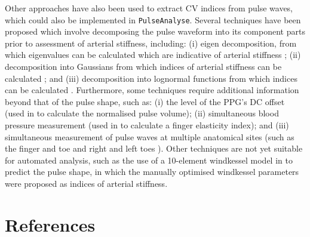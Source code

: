 \documentclass[12pt]{iopart}
\newcommand{\pa}{\texttt{PulseAnalyse}}
\begin{document}
Other approaches have also been used to extract CV indices from pulse waves, which could also be implemented in \pa{}. Several techniques have been proposed which involve decomposing the pulse waveform into its component parts prior to assessment of arterial stiffness, including: (i) eigen decomposition, from which eigenvalues can be calculated which are indicative of arterial stiffness \cite{Angarita-jaimes2006}; (ii) decomposition into Gaussians from which indices of arterial stiffness can be calculated \cite{Rubins2008}; and (iii) decomposition into lognormal functions from which indices can be calculated \cite{Huotari2011}. Furthermore, some techniques require additional information beyond that of the pulse shape, such as: (i) the level of the PPG's DC offset (used in \cite{Sawada2001} to calculate the normalised pulse volume); (ii) simultaneous blood pressure measurement (used in \cite{Tanaka2011} to calculate a finger elasticity index); and (iii) simultaneous measurement of pulse waves at multiple anatomical sites (such as the finger and toe \cite{Tsai2005,Peltokangas2017} and right and left toes \cite{Allen2008,Allen2005}). Other techniques are not yet suitable for automated analysis, such as the use of a 10-element windkessel model in \cite{Zahedi2007} to predict the pulse shape, in which the manually optimised windkessel parameters were proposed as indices of arterial stiffness.

\newpage


\section*{References}




\end{document}
